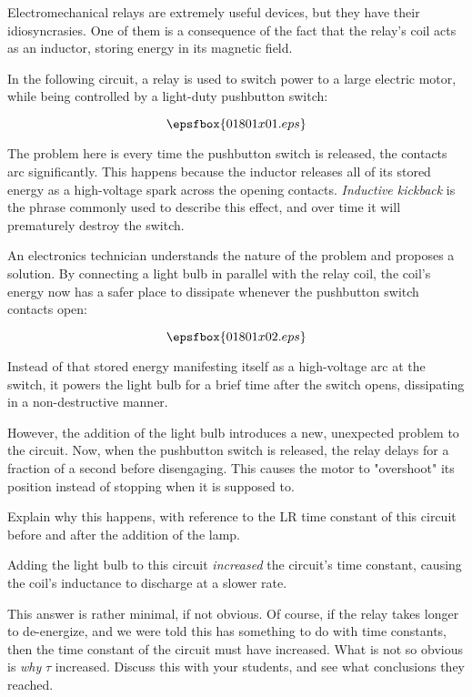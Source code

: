 

Electromechanical relays are extremely useful devices, but they have their idiosyncrasies.  One of them is a consequence of the fact that the relay's coil acts as an inductor, storing energy in its magnetic field.

In the following circuit, a relay is used to switch power to a large electric motor, while being controlled by a light-duty pushbutton switch:

$$\epsfbox{01801x01.eps}$$

The problem here is every time the pushbutton switch is released, the contacts arc significantly.  This happens because the inductor releases all of its stored energy as a high-voltage spark across the opening contacts.  {\it Inductive kickback} is the phrase commonly used to describe this effect, and over time it will prematurely destroy the switch.

An electronics technician understands the nature of the problem and proposes a solution.  By connecting a light bulb in parallel with the relay coil, the coil's energy now has a safer place to dissipate whenever the pushbutton switch contacts open:

$$\epsfbox{01801x02.eps}$$

Instead of that stored energy manifesting itself as a high-voltage arc at the switch, it powers the light bulb for a brief time after the switch opens, dissipating in a non-destructive manner.

However, the addition of the light bulb introduces a new, unexpected problem to the circuit.  Now, when the pushbutton switch is released, the relay delays for a fraction of a second before disengaging.  This causes the motor to "overshoot" its position instead of stopping when it is supposed to.

Explain why this happens, with reference to the LR time constant of this circuit before and after the addition of the lamp.







Adding the light bulb to this circuit {\it increased} the circuit's time constant, causing the coil's inductance to discharge at a slower rate.







This answer is rather minimal, if not obvious.  Of course, if the relay takes longer to de-energize, and we were told this has something to do with time constants, then the time constant of the circuit must have increased.  What is not so obvious is {\it why} $\tau$ increased.  Discuss this with your students, and see what conclusions they reached.




